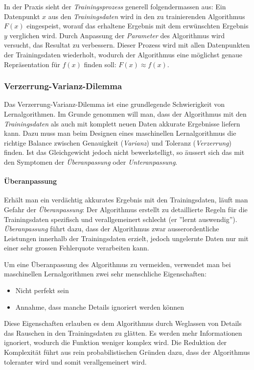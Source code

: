 In der Praxis sieht der \textit{Trainingsprozess} generell folgendermassen aus: Ein Datenpunkt $x$ aus den \textit{Trainingsdaten} wird in den zu trainierenden Algorithmus $F(x)$ eingespeist, worauf das erhaltene Ergebnis mit dem erwünschten Ergebnis $y$ verglichen wird. Durch Anpassung der \textit{Parameter} des Algorithmus wird versucht, das Resultat zu verbessern. Dieser Prozess wird mit allen Datenpunkten der Trainingsdaten wiederholt, wodurch der Algorithmus eine möglichst genaue Repräsentation für $f(x)$ finden soll: $F(x) \approx f(x)$.

\subsubsection{Verzerrung-Varianz-Dilemma}\label{cha:theo:ml:b-v}
Das Verzerrung-Varianz-Dilemma\cite{bias} ist eine grundlegende Schwierigkeit von Lernalgorithmen. Im Grunde genommen will man, dass der Algorithmus mit den \textit{Trainingsdaten} als auch mit komplett neuen Daten akkurate Ergebnisse liefern kann. Dazu muss man beim Designen eines maschinellen Lernalgorithmus die richtige Balance zwischen Genauigkeit (\textit{Varianz}) und Toleranz (\textit{Verzerrung}) finden. Ist das Gleichgewicht jedoch nicht bewerkstelligt, so äussert sich das mit den Symptomen der \textit{Überanpassung} oder \textit{Unteranpassung}.

\paragraph{Überanpassung} Erhält man ein verdächtig akkurates Ergebnis mit den Trainingsdaten, läuft man Gefahr der \textit{Überanpassung}: Der Algorithmus erstellt zu detaillierte Regeln für die Trainingsdaten spezifisch und verallgemeinert schlecht (er ''lernt auswendig''). \textit{Überanpassung} führt dazu, dass der Algorithmus zwar ausserordentliche Leistungen innerhalb der Trainingsdaten erzielt, jedoch ungelernte Daten nur mit einer sehr grossen Fehlerquote verarbeiten kann.

Um eine Überanpassung des Algorithmus zu vermeiden, verwendet man bei maschinellen Lernalgorithmen zwei sehr menschliche Eigenschaften:
\begin{itemize}[leftmargin=2cm]
	\item Nicht perfekt sein
	\item Annahme, dass manche Details ignoriert werden können
\end{itemize}
Diese Eigenschaften erlauben es dem Algorithmus durch Weglassen von Details das Rauschen in den Trainingsdaten zu glätten. Es werden mehr Informationen ignoriert, wodurch die Funktion weniger komplex wird. Die Reduktion der Komplexität führt aus rein probabilistischen Gründen dazu, dass der Algorithmus toleranter wird und somit verallgemeinert wird\cite{welch_prob}.

